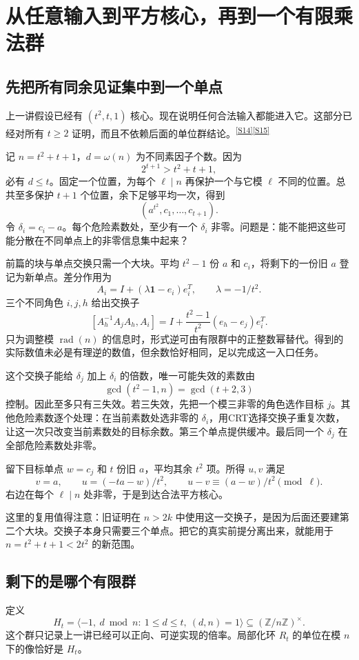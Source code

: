 \documentclass[11pt,a4paper,oneside,openany]{book}
\newcommand{\Z}{\mathbb Z}\newcommand{\Q}{\mathbb Q}\newcommand{\F}{\mathbb F}\newcommand{\CC}{\mathbb C}
\newcommand{\rad}{\operatorname{rad}}\newcommand{\diag}{\operatorname{diag}}
\newcommand{\src}[1]{\textsuperscript{\hyperref[source:#1]{[#1]}}}
\theoremstyle{definition}\newtheorem{example}[theorem]{例}\newtheorem{conjecture}[theorem]{猜想}
\numberwithin{equation}{chapter}\setcounter{tocdepth}{1}
\begin{document}
\chapter{从任意输入到平方核心，再到一个有限乘法群}\label{ch:entry}
\section{先把所有同余见证集中到一个单点}
上一讲假设已经有 $(t^2,t,1)$ 核心。现在说明任何合法输入都能进入它。这部分已经对所有 $t\ge2$ 证明，而且不依赖后面的单位群结论。\src{S14}\src{S15}

记 $n=t^2+t+1$，$d=\omega(n)$ 为不同素因子个数。因为
\[2^{t+1}>t^2+t+1,
\]
必有 $d\le t$。固定一个位置，为每个 $\ell\mid n$ 再保护一个与它模 $\ell$ 不同的位置。总共至多保护 $t+1$ 个位置，余下足够平均一次，得到
\[(a^{t^2},c_1,\ldots,c_{t+1}).
\]
令 $\delta_i=c_i-a$。每个危险素数处，至少有一个 $\delta_i$ 非零。问题是：能不能把这些可能分散在不同单点上的非零信息集中起来？

前篇的块与单点交换只需一个大块。平均 $t^2-1$ 份 $a$ 和 $c_i$，将剩下的一份旧 $a$ 登记为新单点。差分作用为
\[A_i=I+(\lambda\mathbf1-e_i)e_i^T,\qquad\lambda=-1/t^2.
\]
三个不同角色 $i,j,h$ 给出交换子
\[[A_h^{-1}A_jA_h,A_i]
=I+\frac{t^2-1}{t^2}(e_h-e_j)e_i^T.
\]
只为调整模 $\rad(n)$ 的信息时，形式逆可由有限群中的正整数幂替代。得到的实际数值未必是有理逆的数值，但余数恰好相同，足以完成这一入口任务。

这个交换子能给 $\delta_j$ 加上 $\delta_i$ 的倍数，唯一可能失效的素数由
\[\gcd(t^2-1,n)=\gcd(t+2,3)
\]
控制。因此至多只有三失效。若三失效，先把一个模三非零的角色选作目标 $j$。其他危险素数逐个处理：在当前素数处选非零的 $\delta_i$，用CRT选择交换子重复次数，让这一次只改变当前素数处的目标余数。第三个单点提供缓冲。最后同一个 $\delta_j$ 在全部危险素数处非零。

留下目标单点 $w=c_j$ 和 $t$ 份旧 $a$，平均其余 $t^2$ 项。所得 $u,v$ 满足
\[v=a,\qquad u=(-ta-w)/t^2,\qquad
u-v\equiv(a-w)/t^2\pmod\ell.
\]
右边在每个 $\ell\mid n$ 处非零，于是到达合法平方核心。

这里的复用值得注意：旧证明在 $n>2k$ 中使用这一交换子，是因为后面还要建第二个大块。交换子本身只需要三个单点。把它的真实前提分离出来，就能用于 $n=t^2+t+1<2t^2$ 的新范围。

\section{剩下的是哪个有限群}
定义
\begin{equation}\label{eq:Ht}
H_t=\langle-1,\ d\bmod n:\ 1\le d\le t,\ (d,n)=1\rangle
\subseteq(\Z/n\Z)^\times.
\end{equation}
这个群只记录上一讲已经可以正向、可逆实现的倍率。局部化环 $R_t$ 的单位在模 $n$ 下的像恰好是 $H_t$。
\end{document}
